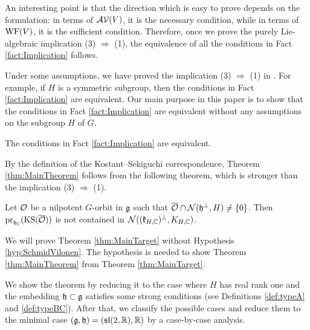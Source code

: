An interesting point is that the direction which is easy to prove depends on the formulation: in terms of $\mathcal{AV}(V)$, it is the necessary condition, while in terms of $\mathrm{WF}(V)$, it is the sufficient condition.
Therefore, once we prove the purely Lie-algebraic implication (3) $\Rightarrow$ (1), the equivalence of all the conditions in Fact \ref{fact:Implication} follows.

Under some assumptions, we have proved the implication (3) $\Rightarrow$ (1) in \cite[Theorem 21]{Ki24}.
For example, if $H$ is a symmetric subgroup, then the conditions in Fact \ref{fact:Implication} are equivalent.
Our main purpose in this paper is to show that the conditions in Fact \ref{fact:Implication} are equivalent without any assumptions on the subgroup $H$ of $G$.

\begin{theorem} \label{thm:MainTheorem}
	The conditions in Fact \ref{fact:Implication} are equivalent.
\end{theorem}

By the definition of the Kostant--Sekiguchi correspondence, Theorem \ref{thm:MainTheorem} follows from the following theorem, which is stronger than the implication (3) $\Rightarrow$ (1).

\begin{theorem} \label{thm:MainTarget}
	Let $\mathcal{O}$ be a nilpotent $G$-orbit in $\mathfrak{g}$ such that $\overline{\mathcal{O}}\cap \mathcal{N}(\mathfrak{h}^\perp, H) \neq \left\{0 \right\}$.
	Then $\mathrm{pr}_{\mathfrak{h}_{\mathbb{C}}}(\mathrm{KS}(\overline{\mathcal{O}}))$ is not contained in $\mathcal{N}((\mathfrak{k}_{H, \mathbb{C}})^\perp, K_{H, \mathbb{C}})$.
\end{theorem}

\begin{remark}
	We will prove Theorem \ref{thm:MainTarget} without Hypothesis \ref{hyp:SchmidVilonen}.
	The hypothesis is needed to show Theorem \ref{thm:MainTheorem} from Theorem \ref{thm:MainTarget}.
\end{remark}

We show the theorem by reducing it to the case where $H$ has real rank one and the embedding $\mathfrak{h}\subset \mathfrak{g}$ satisfies some strong conditions (see Definitions \ref{def:typeA} and \ref{def:typeBC}).
After that, we classify the possible cases and reduce them to the minimal case $(\mathfrak{g}, \mathfrak{h}) = (\mathfrak{sl}(2,\mathbb{R}), \mathbb{R})$ by a case-by-case analysis.